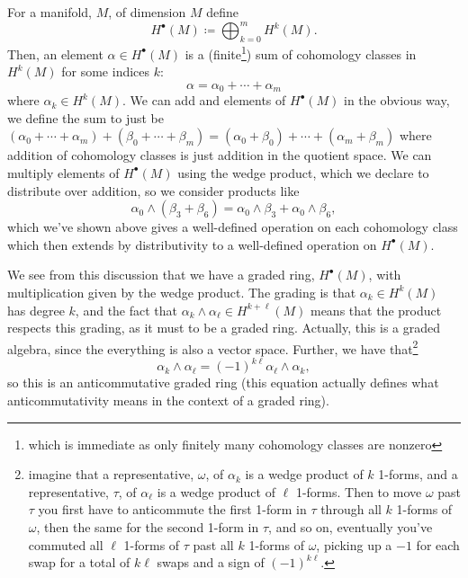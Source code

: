 \documentclass[fleqn]{NotesClass}
\begin{document}
    For a manifold, \(M\), of dimension \(M\) define
    \begin{equation}
        H^\bullet(M) \coloneqq \bigoplus_{k=0}^m H^k(M).
    \end{equation}
    Then, an element \(\alpha \in H^{\bullet}(M)\) is a (finite\footnote{which is immediate as only finitely many cohomology classes are nonzero}) sum of cohomology classes in \(H^k(M)\) for some indices \(k\):
    \begin{equation}
        \alpha = \alpha_0 + \dotsb + \alpha_m
    \end{equation}
    where \(\alpha_k \in H^k(M)\).
    We can add and elements of \(H^{\bullet}(M)\) in the obvious way, we define the sum to just be \((\alpha_0 + \dotsb + \alpha_m) + (\beta_0 + \dotsb + \beta_m) = (\alpha_0 + \beta_0) + \dotsb + (\alpha_m + \beta_m)\) where addition of cohomology classes is just addition in the quotient space.
    We can multiply elements of \(H^{\bullet}(M)\) using the wedge product, which we declare to distribute over addition, so we consider products like
    \begin{equation}
        \alpha_0 \wedge (\beta_3 + \beta_6) = \alpha_0 \wedge \beta_3 + \alpha_0 \wedge \beta_6,
    \end{equation}
    which we've shown above gives a well-defined operation on each cohomology class which then extends by distributivity to a well-defined operation on \(H^{\bullet}(M)\).
    
    We see from this discussion that we have a graded ring, \(H^{\bullet}(M)\), with multiplication given by the wedge product.
    The grading is that \(\alpha_k \in H^k(M)\) has degree \(k\), and the fact that \(\alpha_k \wedge \alpha_\ell \in H^{k + \ell}(M)\) means that the product respects this grading, as it must to be a graded ring.
    Actually, this is a graded algebra, since the everything is also a vector space.
    Further, we have that\footnote{imagine that a representative, \(\omega\), of \(\alpha_k\) is a wedge product of \(k\) 1-forms, and a representative, \(\tau\), of \(\alpha_\ell\) is a wedge product of \(\ell\) 1-forms. Then to move \(\omega\) past \(\tau\) you first have to anticommute the first 1-form in \(\tau\) through all \(k\) 1-forms of \(\omega\), then the same for the second 1-form in \(\tau\), and so on, eventually you've commuted all \(\ell\) 1-forms of \(\tau\) past all \(k\) 1-forms of \(\omega\), picking up a \(-1\) for each swap for a total of \(k\ell\) swaps and a sign of \((-1)^{k\ell}\).}
    \begin{equation}
        \alpha_k \wedge \alpha_\ell = (-1)^{k\ell} \alpha_\ell \wedge \alpha_k,
    \end{equation}
    so this is an anticommutative graded ring (this equation actually defines what anticommutativity means in the context of a graded ring).
    
\end{document}

